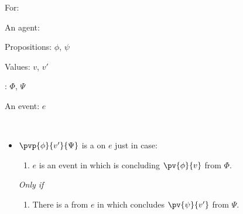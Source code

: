 \begin{note}
  \begin{definition}[A \curb{0}]
    \label{def:curb}
    For:

    \begin{itemize*}[noitemsep]
    \item
      An agent: \vAgent{}
    \item
      Propositions: \(\phi\), \(\psi\)
    \item
      Values: \(v\), \(v'\)
    \item
      : \(\Phi\), \(\Psi\)
    \item
      An event: \(e\)
    \item
      \mbox{ }
    \end{itemize*}

    \begin{itemize}
    \item
      \(\pvp{\phi}{v'}{\Psi}\) is a \emph{\curb{}} on \(e\) just in case:

      \begin{enumerate}[label=\alph*., ref=(\alph*), series=curbDefSeries]
      \item
        \(e\) is an event in which \vAgent{} is concluding \(\pv{\phi}{v}\) from \(\Phi\).
      \end{enumerate}

      \emph{Only if}

      \begin{enumerate}[label=\alph*., ref=(\alph*), resume*=curbDefSeries]
      \item
        \label{def:curb:opp}
        There is a \pevent{} from \(e\) in which \vAgent{} concludes \(\pv{\psi}{v'}\) from \(\Psi\).
      \end{enumerate}
    \end{itemize}
    \vspace{-\baselineskip}
  \end{definition}


\end{note}

